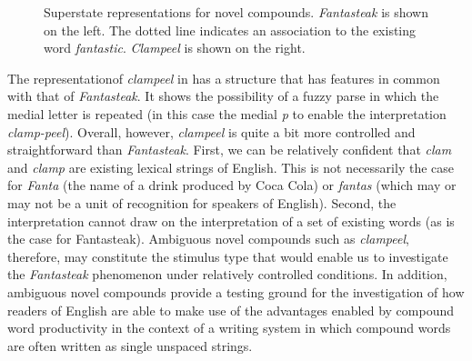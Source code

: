 \documentclass[output=paper]{langsci/langscibook}
\begin{document}
\begin{figure} 
    \begin{minipage}{.5\linewidth}\centering%
    \end{minipage}\begin{minipage}{.5\linewidth}\centering%
    \end{minipage}
\caption{\label{fig:libben:3}Superstate representations for novel compounds. \textit{Fantasteak} is shown on the left.  The dotted line indicates an association to the existing word \textit{fantastic}.  \textit{Clampeel} is shown on the right.}
\end{figure}

The representation\largerpage[-1] of \textit{clampeel} in  has a structure that has features in common with that of \textit{Fantasteak}.  It shows the possibility of a fuzzy parse in which the medial letter is repeated (in this case the medial \textit{p} to enable the interpretation \textit{clamp-peel}).  Overall, however, \textit{clampeel} is quite a bit more controlled and straightforward than \textit{Fantasteak}. First, we can be relatively confident that \textit{clam} and \textit{clamp} are existing lexical strings of English. This is not necessarily the case for \textit{Fanta} (the name of a drink produced by Coca Cola) or \textit{fantas} (which may or may not be a unit of recognition for speakers of English). Second, the interpretation cannot draw on the interpretation of a set of existing words (as is the case for Fantasteak).  Ambiguous novel compounds such as \textit{clampeel}, therefore, may constitute the stimulus type that would enable us to investigate the \textit{Fantasteak} phenomenon under relatively controlled conditions. In addition, ambiguous novel compounds provide a testing ground for the investigation of how readers of English are able to make use of the advantages enabled by compound word productivity in the context of a writing system in which compound words are often written as single unspaced strings. 
\end{document}

